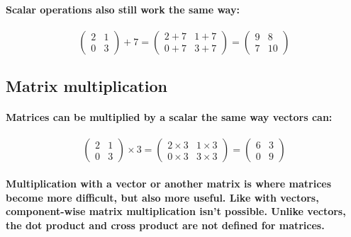 \paragraph{
    Scalar operations also still work the same way:
}

\paragraph{
    \begin{equation*}
    \begin{pmatrix}
    2 & 1\\
    0 & 3
    \end{pmatrix} +7=\begin{pmatrix}
    2+7 & 1+7\\
    0+7 & 3+7
    \end{pmatrix} =\begin{pmatrix}
    9 & 8\\
    7 & 10
    \end{pmatrix}
    \end{equation*}
}

\subsection{Matrix multiplication}
\paragraph{
    Matrices can be multiplied by a scalar the same way vectors can:
}

\paragraph{
    \begin{equation*}
    \begin{pmatrix}
    2 & 1\\
    0 & 3
    \end{pmatrix} \times 3=\begin{pmatrix}
    2\times 3 & 1\times 3\\
    0\times 3 & 3\times 3
    \end{pmatrix} =\begin{pmatrix}
    6 & 3\\
    0 & 9
    \end{pmatrix}
    \end{equation*}
}

\paragraph{
    Multiplication with a vector or another matrix is where matrices become more difficult, but also more useful. Like with vectors, component-wise matrix multiplication isn't possible. Unlike vectors, the dot product and cross product are not defined for matrices.
}